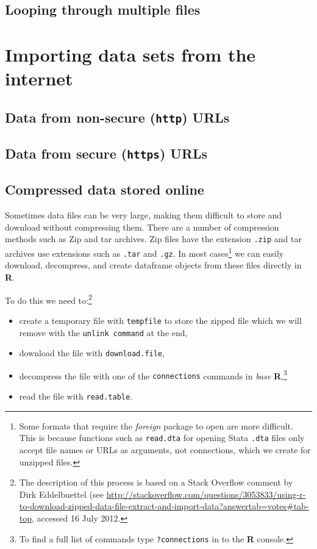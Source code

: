 \documentclass[ChapterTOCs,krantz1]{krantz}\usepackage{graphicx, color}
\begin{document}
\subsection{Looping through multiple files}

\section{Importing data sets from the internet}

\subsection{Data from non-secure ({\tt{http}}) URLs}

\subsection{Data from secure ({\tt{https}}) URLs}

\subsection{Compressed data stored online}

Sometimes data files can be very large, making them difficult to store and download without compressing them. There are a number of compression methods such as Zip and tar archives. Zip files have the extension {\tt{.zip}} and tar archives use extensions such as {\tt{.tar}} and {\tt{.gz}}. In most cases\footnote{Some formats that require the {\emph{foreign}} package to open are more difficult. This is because functions such as {\tt{read.dta}} for opening Stata {\tt{.dta}} files only accept file names or URLs as arguments, not connections, which we create for unzipped files.} we can easily download, decompress, and create dataframe objects from these files directly in {\bf{R}}. 

To do this we need to:\footnote{The description of this process is based on a Stack Overflow comment by Dirk Eddelbuettel (see {\url{http://stackoverflow.com/questions/3053833/using-r-to-download-zipped-data-file-extract-and-import-data?answertab=votes\#tab-top}}, accessed 16 July 2012.}

\begin{itemize}
    \item create a temporary file with {\tt{tempfile}} to store the zipped file which we will remove with the {\tt{unlink command}} at the end,
    \item download the file with {\tt{download.file}},
    \item decompress the file with one of the {\tt{connections}} commands in {\emph{base}} {\bf{R}},\footnote{To find a full list of commands type {\tt{?connections}} in to the {\bf{R}} console.}
    \item read the file with {\tt{read.table}}. 
\end{itemize}
\end{document}
